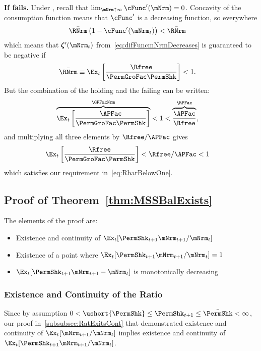 \documentclass[\econtexRoot/BufferStockTheory]{subfiles}
\begin{document}
\textbf{If {\RIC} fails.}
Under \cncl{\RIC}, recall that $\lim_{\mNrm \uparrow \infty} \cFunc^{\prime}(\mNrm) = 0$.  Concavity of the consumption function means that $\cFunc^{\prime}$ is a decreasing function, so everywhere 
\begin{align*}
  \bar{\RNrm}\left(1-\cFunc^{\prime}({\mNrm}_t)\right) & < \bar{\RNrm}
\end{align*}
which means that $\difFunc^{\prime}(\mNrm_{t})$ from~\eqref{eq:difFuncmNrmDecreases} is guaranteed to be negative if
\begin{align}
  \bar{\RNrm} \equiv \Ex_{t}\left[\frac{\Rfree}{\PermGroFac \PermShk}\right] & < 1  \label{eq:RbarBelowOne}.
\end{align}
But the combination of the {\GICNrm} holding and the {\RIC} failing can be written:
\begin{align*}
  \overbrace{\Ex_{t}\left[\frac{\APFac}{\PermGroFac \PermShk}\right]}^{\GPFacNrm} & < 1 < \overbrace{\frac{\APFac}{\Rfree}}^{{\RPFac}},
\end{align*}
and multiplying all three elements by $\Rfree/\APFac$ gives 
\begin{align*}
  \Ex_{t}\left[\frac{\Rfree}{\PermGroFac \PermShk}\right] & < \Rfree/\APFac < 1
\end{align*}
which satisfies our requirement in~\eqref{eq:RbarBelowOne}.

  
\subsection{Proof of Theorem~\ref{thm:MSSBalExists}}

The elements of the proof are:
\begin{itemize}
\item Existence and continuity of $\Ex_{t}[\PermShk_{t+1}\mNrm_{t+1}/\mNrm_t]$
\item Existence of a point where $\Ex_{t}[\PermShk_{t+1}\mNrm_{t+1}/\mNrm_t] = 1$
\item $\Ex_{t}[\PermShk_{t+1}\mNrm_{t+1}-\mNrm_{t}]$ is monotonically decreasing
\end{itemize}

\subsubsection{Existence and Continuity of the Ratio}%

Since by assumption $ 0 < \ushort{\PermShk} \leq \PermShk_{t+1} \leq \bar{\PermShk} < \infty$, our proof in~\ref{subsubsec:RatExitsCont} that demonstrated existence and continuity of $\Ex_{t}[\mNrm_{t+1}/\mNrm_{t}]$ implies existence and continuity of $\Ex_{t}[\PermShk_{t+1}\mNrm_{t+1}/\mNrm_{t}]$.
\end{document}

